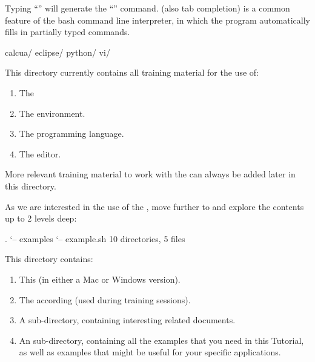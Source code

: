Typing ``'' will generate the
``'' command. (also tab completion) is a common feature of the bash command line
interpreter, in which the program automatically fills in partially typed
commands.

\begin{prompt}
calcua/
eclipse/
python/
vi/
\end{prompt}

This directory currently contains all training material for the use of:

\begin{enumerate}
\item  The 
\item  The  environment.
\item  The  programming language.
\item  The  editor.
\end{enumerate}

More relevant training material to work with the \hpc can always be added
later in this directory.

As we are interested in the use of the , move
further to  and explore the contents up to 2 levels
deep:

\begin{prompt}
.
`-- examples
    `-- example.sh
10 directories, 5 files
\end{prompt}

This directory contains:

\begin{enumerate}
  \item This  (in either a Mac or Windows
    version).
  \item The according  (used during training
    sessions).
  \item A  sub-directory, containing interesting \hpc
    related documents.
  \item An  sub-directory, containing all the
    examples that you need in this Tutorial, as well as examples that might be
    useful for your specific applications.
\end{enumerate}

